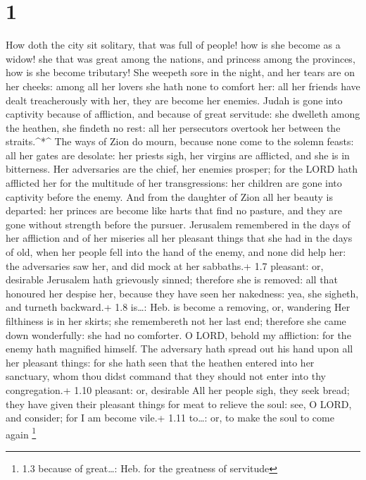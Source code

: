 \hypertarget{section}{%
\section{1}\label{section}}

 How doth the city sit solitary, that was full of people!
how is she become as a widow! she that was great among the nations, and
princess among the provinces, how is she become tributary! 
She weepeth sore in the night, and her tears are on her cheeks: among
all her lovers she hath none to comfort her: all her friends have dealt
treacherously with her, they are become her enemies.  Judah
is gone into captivity because of affliction, and because of great
servitude: she dwelleth among the heathen, she findeth no rest: all her
persecutors overtook her between the straits.\^{}*\^{}  The
ways of Zion do mourn, because none come to the solemn feasts: all her
gates are desolate: her priests sigh, her virgins are afflicted, and she
is in bitterness.  Her adversaries are the chief, her
enemies prosper; for the LORD hath afflicted her for the multitude of
her transgressions: her children are gone into captivity before the
enemy.  And from the daughter of Zion all her beauty is
departed: her princes are become like harts that find no pasture, and
they are gone without strength before the pursuer. 
Jerusalem remembered in the days of her affliction and of her miseries
all her pleasant things that she had in the days of old, when her people
fell into the hand of the enemy, and none did help her: the adversaries
saw her, and did mock at her sabbaths.+ 1.7 pleasant: or, desirable
 Jerusalem hath grievously sinned; therefore she is removed:
all that honoured her despise her, because they have seen her nakedness:
yea, she sigheth, and turneth backward.+ 1.8 is\ldots: Heb. is become a
removing, or, wandering  Her filthiness is in her skirts;
she remembereth not her last end; therefore she came down wonderfully:
she had no comforter. O LORD, behold my affliction: for the enemy hath
magnified himself.  The adversary hath spread out his hand
upon all her pleasant things: for she hath seen that the heathen entered
into her sanctuary, whom thou didst command that they should not enter
into thy congregation.+ 1.10 pleasant: or, desirable  All
her people sigh, they seek bread; they have given their pleasant things
for meat to relieve the soul: see, O LORD, and consider; for I am become
vile.+ 1.11 to\ldots: or, to make the soul to come again \footnote{1.3
  because of great\ldots: Heb. for the greatness of servitude}

